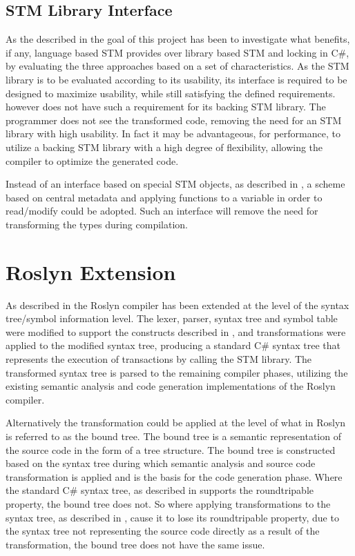 \subsection{STM Library Interface}
As the described in  the goal of this project has been to investigate what benefits, if any, language based \ac{STM} provides over library based \ac{STM} and locking in C\#, by evaluating the three approaches based on a set of characteristics. As the \ac{STM} library is to be evaluated according to its usability, its interface is required to be designed to maximize usability, while still satisfying the defined requirements. \stmname however does not have such a requirement for its backing \ac{STM} library. The programmer does not see the transformed code, removing the need for an \ac{STM} library with high usability. In fact it may be advantageous, for performance, to utilize a backing \ac{STM} library with a high degree of flexibility, allowing the compiler to optimize the generated code. 

Instead of an interface based on special \ac{STM} objects, as described in , a scheme based on central metadata and applying functions to a variable in order to read/modify could be adopted. Such an interface will remove the need for transforming the types during compilation.

\section{Roslyn Extension}
As described in  the Roslyn compiler has been extended at the level of the syntax tree/symbol information level. The lexer, parser, syntax tree and symbol table were modified to support the constructs described in , and transformations were applied to the modified syntax tree, producing a standard C\# syntax tree that represents the execution of transactions by calling the \ac{STM} library. The transformed syntax tree is parsed to the remaining compiler phases, utilizing the existing semantic analysis and code generation implementations of the Roslyn compiler. 

Alternatively the transformation could be applied at the level of what in Roslyn is referred to as the bound tree. The bound tree is a semantic representation of the source code in the form of a tree structure. The bound tree is constructed based on the syntax tree during which semantic analysis and source code transformation is applied and is the basis for the code generation phase. Where the standard C\# syntax tree, as described in  supports the roundtripable property, the bound tree does not. So where applying transformations to the syntax tree, as described in , cause it to lose its roundtripable property, due to the syntax tree not representing the source code directly as a result of the transformation, the bound tree does not have the same issue.

